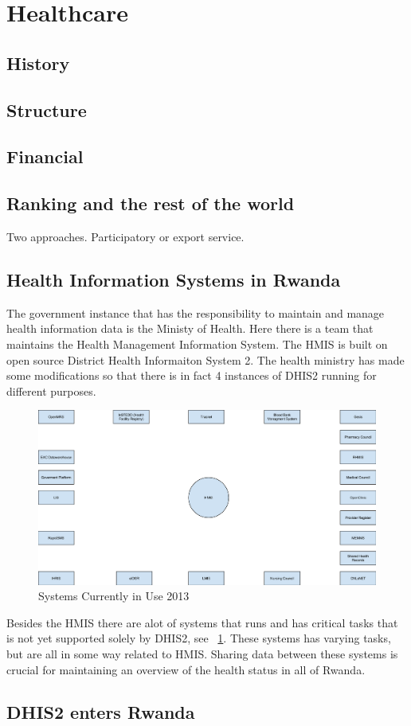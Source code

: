 \section{Healthcare}
\subsection{History}
\subsection{Structure}
\subsection{Financial}
\subsection{Ranking and the rest of the world}
Two approaches. Participatory or export service.
\subsection{Health Information Systems in Rwanda}
The government instance that has the responsibility to maintain and manage health information data is the Ministy of Health. Here there is a team that maintains the Health Management Information System.
The HMIS  is built on open source District Health Informaiton System 2. 
The health ministry has made some modifications so that there is in fact 4 instances of DHIS2 running for different purposes.
\begin{figure}
\centering
\includegraphics[width=12cm]{empirical/images/context.png}
\caption{Systems Currently in Use 2013}
\label{fig:systems_currently_in_use_2013}
\end{figure}
Besides the HMIS there are alot of systems that runs and has critical tasks that is not yet supported solely by DHIS2, see ~\ref{fig:systems_currently_in_use_2013}. These systems has varying tasks, but are all in some way related to HMIS.
Sharing data between these systems is crucial for maintaining an overview of the health status in all of Rwanda.
\subsection{DHIS2 enters Rwanda}




